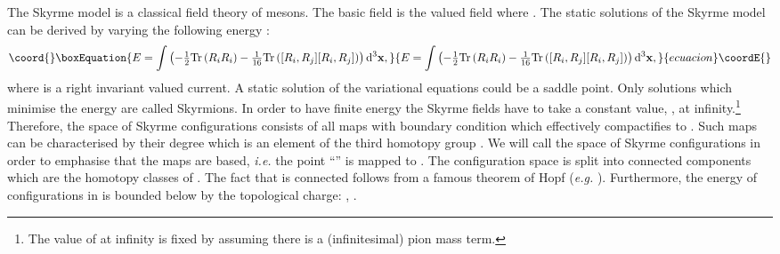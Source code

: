 \documentclass[a4paper,12pt]{article}
\begin{document}
The Skyrme model is a classical field theory of mesons.  The basic
field is the \coordHE{} valued field \coordHE{} where \coordHE{}.  The static solutions of the Skyrme model can be
derived by varying the following energy \cite{Houghton:1998kg}: 
%
\begin{equation}\coord{}\boxEquation{
\label{Estandard}
E = \int \left( -\tfrac{1}{2} {\rm Tr} \left( R_i R_i \right) -
\tfrac{1}{16} {\rm Tr} \left( [R_i, R_j][R_i,R_j] \right) \right) {\rm
d}^3 {\bf x}, 
}{
E = \int \left( -\tfrac{1}{2} {\rm Tr} \left( R_i R_i \right) -
\tfrac{1}{16} {\rm Tr} \left( [R_i, R_j][R_i,R_j] \right) \right) {\rm
d}^3 {\bf x}, 
}{ecuacion}\coordE{}\end{equation}
%
where \coordHE{} is a right invariant
\coordHE{} valued current.  A static solution of the
variational equations could be a saddle point. Only solutions
which minimise the energy are called Skyrmions.  In order to
have finite energy the Skyrme fields have to take a constant value,
\coordHE{}, at infinity.\footnote{The value of \coordHE{} at 
infinity is fixed by assuming there is a (infinitesimal) pion mass term.}
%
Therefore, the space of Skyrme configurations consists of all 
maps \coordHE{} with boundary condition \coordHE{} which effectively compactifies \coordHE{} to \coordHE{}. 
Such  maps can be characterised by their degree which
is an element of the third  homotopy group \coordHE{}. We will call the space of Skyrme configurations \coordHE{} in 
order to emphasise that the maps are based, {\it i.e.}  the point 
``\myHighlight{$\infty$}\coordHE{}'' is mapped to
\coordHE{}. The configuration space \coordHE{} is split into
connected components \coordHE{} which are the homotopy classes of
\coordHE{}. The fact that \coordHE{} is connected follows from a
famous theorem of Hopf ({\it e.g.} \cite{Hatcher:2002}).
Furthermore, the energy of configurations in \coordHE{} is bounded below by the 
topological charge: \coordHE{}, \cite{Faddeev:1976pg}.
\end{document}
